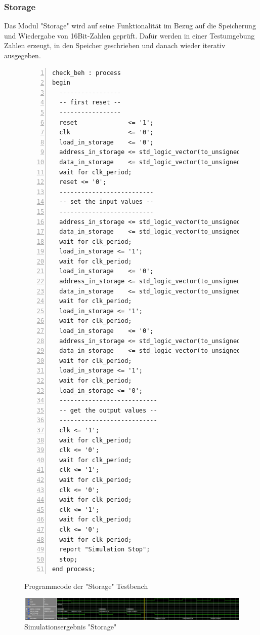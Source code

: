 \documentclass{article}
\numberwithin{equation}{section}
\begin{document}
\subsubsection{Storage}
Das Modul "Storage" wird auf seine Funktionalität im Bezug auf die Speicherung und Wiedergabe
von 16Bit-Zahlen geprüft. Dafür werden in einer Testumgebung Zahlen erzeugt, in den Speicher 
geschrieben und danach wieder iterativ ausgegeben.
\begin{figure}[htbp]
\begin{lstlisting}[style=VHDL,numbers=left,stepnumber=1,style=myCustomMatlabStyle,basicstyle=\footnotesize]
check_beh : process
begin
  -----------------
  -- first reset --
  -----------------
  reset              <= '1';
  clk                <= '0';
  load_in_storage    <= '0';
  address_in_storage <= std_logic_vector(to_unsigned(0, address_in_storage'length));
  data_in_storage    <= std_logic_vector(to_unsigned(0, data_in_storage'length));
  wait for clk_period;
  reset <= '0';
  --------------------------
  -- set the input values --
  --------------------------
  address_in_storage <= std_logic_vector(to_unsigned(0, address_in_storage'length));
  data_in_storage    <= std_logic_vector(to_unsigned(244, data_in_storage'length));
  wait for clk_period;
  load_in_storage <= '1';
  wait for clk_period;
  load_in_storage    <= '0';
  address_in_storage <= std_logic_vector(to_unsigned(1, address_in_storage'length));
  data_in_storage    <= std_logic_vector(to_unsigned(12, data_in_storage'length));
  wait for clk_period;
  load_in_storage <= '1';
  wait for clk_period;
  load_in_storage    <= '0';
  address_in_storage <= std_logic_vector(to_unsigned(2, address_in_storage'length));
  data_in_storage    <= std_logic_vector(to_unsigned(899, data_in_storage'length));
  wait for clk_period;
  load_in_storage <= '1';
  wait for clk_period;
  load_in_storage <= '0';
  ---------------------------
  -- get the output values --
  ---------------------------
  clk <= '1';
  wait for clk_period;
  clk <= '0';
  wait for clk_period;
  clk <= '1';
  wait for clk_period;
  clk <= '0';
  wait for clk_period;
  clk <= '1';
  wait for clk_period;
  clk <= '0';
  wait for clk_period;
  report "Simulation Stop";
  stop;
end process;
\end{lstlisting}
\caption{Programmcode der "Storage" Testbench} \label{code:storage_testbench}
\end{figure}
\pagebreak
\begin{figure}[htb!]
    \begin{center}
      \includegraphics[width=15cm]{SimulationPictures/storage_sim.png}
    \end{center}
    \caption{Simulationsergebnis "Storage"} \label{fig:storage_sim}
  \end{figure}
\end{document}
